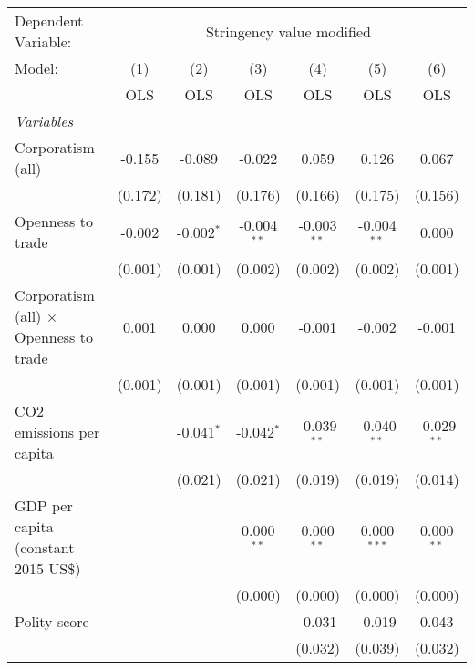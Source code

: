 
\begingroup
\centering
\begin{tabular}{lcccccc}
   \toprule
   Dependent Variable: & \multicolumn{6}{c}{Stringency value modified}\\
   Model:                                        & (1)     & (2)          & (3)           & (4)           & (5)           & (6)\\  
                                                 &  OLS    & OLS          & OLS           & OLS           & OLS           & OLS\\  
   \midrule
   \emph{Variables}\\
   Corporatism (all)                             & -0.155  & -0.089       & -0.022        & 0.059         & 0.126         & 0.067\\   
                                                 & (0.172) & (0.181)      & (0.176)       & (0.166)       & (0.175)       & (0.156)\\   
   Openness to trade                             & -0.002  & -0.002$^{*}$ & -0.004$^{**}$ & -0.003$^{**}$ & -0.004$^{**}$ & 0.000\\   
                                                 & (0.001) & (0.001)      & (0.002)       & (0.002)       & (0.002)       & (0.001)\\   
   Corporatism (all) $\times$ Openness to trade  & 0.001   & 0.000        & 0.000         & -0.001        & -0.002        & -0.001\\   
                                                 & (0.001) & (0.001)      & (0.001)       & (0.001)       & (0.001)       & (0.001)\\   
   CO2 emissions per capita                      &         & -0.041$^{*}$ & -0.042$^{*}$  & -0.039$^{**}$ & -0.040$^{**}$ & -0.029$^{**}$\\   
                                                 &         & (0.021)      & (0.021)       & (0.019)       & (0.019)       & (0.014)\\   
   GDP per capita (constant 2015 US\$)           &         &              & 0.000$^{**}$  & 0.000$^{**}$  & 0.000$^{***}$ & 0.000$^{**}$\\   
                                                 &         &              & (0.000)       & (0.000)       & (0.000)       & (0.000)\\   
   Polity score                                  &         &              &               & -0.031        & -0.019        & 0.043\\   
                                                 &         &              &               & (0.032)       & (0.039)       & (0.032)\\   

\end{tabular}
